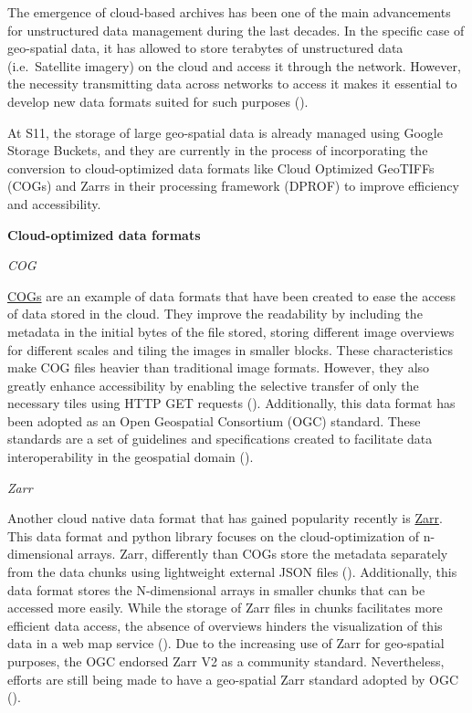 \documentclass[
  oneside,
  open=any]{scrbook}
\begin{document}
The emergence of cloud-based archives has been one of the main
advancements for unstructured data management during the last decades.
In the specific case of geo-spatial data, it has allowed to store
terabytes of unstructured data (i.e.~Satellite imagery) on the cloud and
access it through the network. However, the necessity transmitting data
across networks to access it makes it essential to develop new data
formats suited for such purposes
().

At S11, the storage of large geo-spatial data is already managed using
Google Storage Buckets, and they are currently in the process of
incorporating the conversion to cloud-optimized data formats like Cloud
Optimized GeoTIFFs (COGs) and Zarrs in their processing framework
(DPROF) to improve efficiency and accessibility.

\newpage

\textbf{Cloud-optimized data formats}

\emph{COG}

\href{https://www.cogeo.org/}{COGs} are an example of data formats that
have been created to ease the access of data stored in the cloud. They
improve the readability by including the metadata in the initial bytes
of the file stored, storing different image overviews for different
scales and tiling the images in smaller blocks. These characteristics
make COG files heavier than traditional image formats. However, they
also greatly enhance accessibility by enabling the selective transfer of
only the necessary tiles using HTTP GET requests
().
Additionally, this data format has been adopted as an Open Geospatial
Consortium (OGC) standard. These standards are a set of guidelines and
specifications created to facilitate data interoperability in the
geospatial domain ().

\emph{Zarr}

Another cloud native data format that has gained popularity recently is
\href{https://zarr.readthedocs.io/en/stable/}{Zarr}. This data format
and python library focuses on the cloud-optimization of n-dimensional
arrays. Zarr, differently than COGs store the metadata separately from
the data chunks using lightweight external JSON files
().
Additionally, this data format stores the N-dimensional arrays in
smaller chunks that can be accessed more easily. While the storage of
Zarr files in chunks facilitates more efficient data access, the absence
of overviews hinders the visualization of this data in a web map service
(). Due
to the increasing use of Zarr for geo-spatial purposes, the OGC endorsed
Zarr V2 as a community standard. Nevertheless, efforts are still being
made to have a geo-spatial Zarr standard adopted by OGC
().
\end{document}
